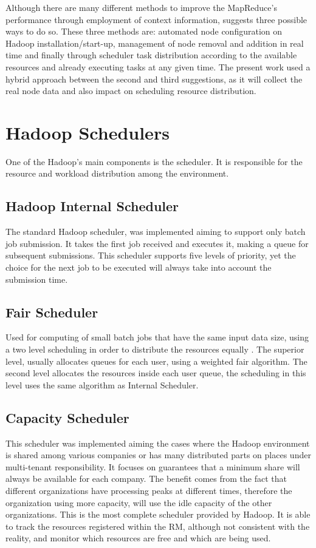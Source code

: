 Although there are many different methods to improve the MapReduce's performance through employment of context information, \cite{Manuele} suggests three possible ways to do so. These three methods are: automated node configuration on Hadoop installation/start-up, management of node removal and addition in real time and finally through scheduler task distribution according to the available resources and already executing tasks at any given time. The present work used a hybrid approach between the second and third suggestions, as it will collect the real node data and also impact on scheduling resource distribution.


\section{Hadoop Schedulers}
\label{sec:Hadoop Schedulers}
One of the Hadoop's main components is the scheduler. It is responsible for the resource and workload distribution among the environment. 

\subsection{Hadoop Internal Scheduler}
The standard Hadoop scheduler, was implemented aiming to support only batch job submission. It takes the first job received and executes it, making a queue for subsequent submissions. This scheduler supports five levels of priority, yet the choice for the next job to be executed will always take into account the submission time.

\subsection{Fair Scheduler}
Used for computing of small batch jobs that have the same input data size, using a two level scheduling in order to distribute the resources equally \cite{FairScheduler}. The superior level, usually allocates queues for each user, using a weighted fair algorithm. The second level allocates the resources inside each user queue, the scheduling in this level uses the same algorithm as Internal Scheduler.

\subsection{Capacity Scheduler}
This scheduler was implemented aiming the cases where the Hadoop environment is shared among various companies or has many distributed parts on places under multi-tenant responsibility. It focuses on guarantees that a minimum share will always be available for each company. The benefit comes from the fact that different organizations have processing peaks at different times, therefore the organization using more capacity, will use the idle capacity of the other organizations. This is the most complete scheduler provided by Hadoop. It is able to track the resources registered within the RM, although not consistent with the reality, and monitor which resources are free and which are being used.

